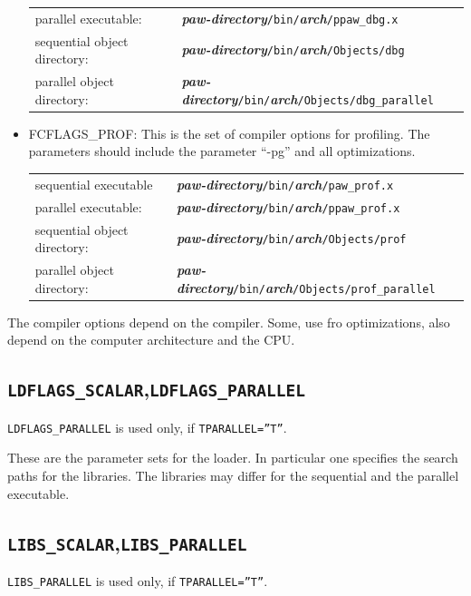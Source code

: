 \documentclass[a4paper,10pt]{report}
\newcommand{\myspec}[1]{\textbf{\textit{#1}}}
\newcommand{\mytt}[1]{{\tt #1}}
\begin{document}
\begin{itemize}
\begin{center}
\begin{tabular}{|l|l|}
 parallel executable: &
\myspec{paw-directory}\mytt{/bin/}\myspec{arch}\mytt{/ppaw\_dbg.x}\\
sequential object directory: &
\myspec{paw-directory}\mytt{/bin/}\myspec{arch}\mytt{/Objects/dbg}\\
parallel object directory: &
\myspec{paw-directory}\mytt{/bin/}\myspec{arch}\mytt{/Objects/dbg\_parallel}\\
\hline
\end{tabular}
\end{center}
\item FCFLAGS\_PROF: This is the set of compiler options for profiling.
The parameters should include the parameter ``-pg'' and all optimizations.
\begin{center}
\begin{tabular}{|l|l|}
\hline
sequential executable &
\myspec{paw-directory}\mytt{/bin/}\myspec{arch}\mytt{/paw\_prof.x}\\
 parallel executable: &
\myspec{paw-directory}\mytt{/bin/}\myspec{arch}\mytt{/ppaw\_prof.x}\\
sequential object directory: &
\myspec{paw-directory}\mytt{/bin/}\myspec{arch}\mytt{/Objects/prof}\\
parallel object directory: &
\myspec{paw-directory}\mytt{/bin/}\myspec{arch}\mytt{/Objects/prof\_parallel}\\
\hline
\end{tabular}
\end{center}
\end{itemize}
The compiler options depend on the compiler. Some, use fro
optimizations, also depend on the computer architecture and the CPU.

\subsection{\mytt{LDFLAGS\_SCALAR},\mytt{LDFLAGS\_PARALLEL}}
\mytt{LDFLAGS\_PARALLEL} is used only, if \mytt{TPARALLEL=''T''}.

These are the parameter sets for the loader. In particular one
specifies the search paths for the libraries. The libraries may differ
for the sequential and the parallel executable.

\subsection{\mytt{LIBS\_SCALAR},\mytt{LIBS\_PARALLEL}}
\mytt{LIBS\_PARALLEL} is used only, if \mytt{TPARALLEL=''T''}.
\end{document}
